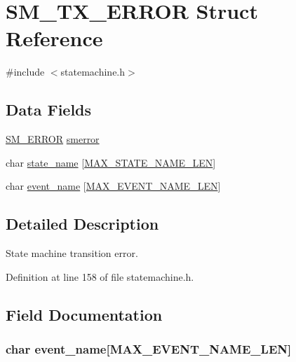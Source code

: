 \hypertarget{struct_s_m___t_x___e_r_r_o_r}{\section{S\-M\-\_\-\-T\-X\-\_\-\-E\-R\-R\-O\-R Struct Reference}
\label{struct_s_m___t_x___e_r_r_o_r}
}


{\ttfamily \#include $<$statemachine.\-h$>$}

\subsection*{Data Fields}
\begin{DoxyCompactItemize}
\item 
\hyperlink{statemachine_8h_a70482ff48418e4ab7788b695da116f0d}{S\-M\-\_\-\-E\-R\-R\-O\-R} \hyperlink{struct_s_m___t_x___e_r_r_o_r_a6906146f5ccfb5982af9c4553ebba49a}{smerror}
\item 
char \hyperlink{struct_s_m___t_x___e_r_r_o_r_a6ef692bc2cb17ff774b80d244d265e2a}{state\-\_\-name} \mbox{[}\hyperlink{statemachine_8h_ae872a1a06e4e888564a80e53455e196d}{M\-A\-X\-\_\-\-S\-T\-A\-T\-E\-\_\-\-N\-A\-M\-E\-\_\-\-L\-E\-N}\mbox{]}
\item 
char \hyperlink{struct_s_m___t_x___e_r_r_o_r_a9e11699506045bb31dbda89f01d22d29}{event\-\_\-name} \mbox{[}\hyperlink{statemachine_8h_a59f77b5219f11ff706733185a1cb4124}{M\-A\-X\-\_\-\-E\-V\-E\-N\-T\-\_\-\-N\-A\-M\-E\-\_\-\-L\-E\-N}\mbox{]}
\end{DoxyCompactItemize}


\subsection{Detailed Description}
State machine transition error. 

Definition at line 158 of file statemachine.\-h.



\subsection{Field Documentation}
\hypertarget{struct_s_m___t_x___e_r_r_o_r_a9e11699506045bb31dbda89f01d22d29}{
\subsubsection[{event\-\_\-name}]{\setlength{\rightskip}{0pt plus 5cm}char event\-\_\-name\mbox{[}{\bf M\-A\-X\-\_\-\-E\-V\-E\-N\-T\-\_\-\-N\-A\-M\-E\-\_\-\-L\-E\-N}\mbox{]}}}\label{struct_s_m___t_x___e_r_r_o_r_a9e11699506045bb31dbda89f01d22d29}


